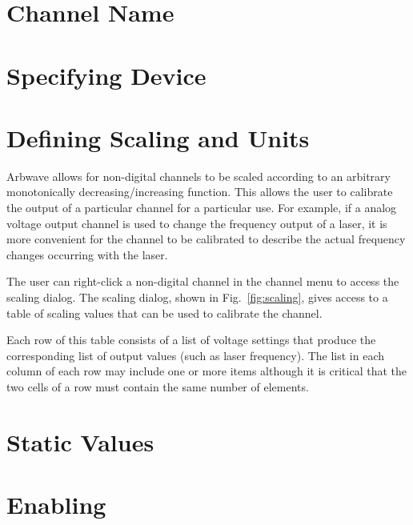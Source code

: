 \thispagestyle{fancy}
\pagestyle{fancy}
\section{Channel Name}
\section{Specifying Device}

\section{Defining Scaling and Units}
Arbwave allows for non-digital channels to be scaled according to an arbitrary
monotonically decreasing/increasing function.  This allows the user to calibrate
the output of a particular channel for a particular use.  For example, if a
analog voltage output channel is used to change the frequency output of a laser,
it is more convenient for the channel to be calibrated to describe the actual
frequency changes occurring with the laser.

The user can right-click a non-digital channel in the channel menu to access the
scaling dialog.  The scaling dialog, shown in Fig.~\ref{fig:scaling}, gives
access to a table of scaling values that can be used to calibrate the channel.

Each row of this table consists of a list of voltage settings that produce the
corresponding list of output values (such as laser frequency).  The list in each
column of each row may include one or more items although it is critical that
the two cells of a row must contain the same number of elements.

\section{Static Values}
\section{Enabling}
